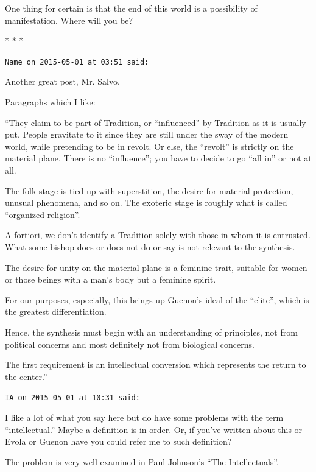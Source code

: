 One thing for certain is that the end of this world is a possibility of manifestation. Where will you be?



\begin{center}* * *\end{center}

\begin{footnotesize}
\begin{sffamily}
\texttt{Name on 2015-05-01 at 03:51 said:}

Another great post, Mr. Salvo.

Paragraphs which I like:

``They claim to be part of Tradition, or ``influenced'' by Tradition as it is usually put. People gravitate to it since they are still under the sway of the modern world, while pretending to be in revolt. Or else, the ``revolt'' is strictly on the material plane. There is no ``influence''; you have to decide to go ``all in'' or not at all.

The folk stage is tied up with superstition, the desire for material protection, unusual phenomena, and so on. The exoteric stage is roughly what is called ``organized religion''.

A fortiori, we don't identify a Tradition solely with those in whom it is entrusted. What some bishop does or does not do or say is not relevant to the synthesis.

The desire for unity on the material plane is a feminine trait, suitable for women or those beings with a man's body but a feminine spirit.

For our purposes, especially, this brings up Guenon's ideal of the ``elite'', which is the greatest differentiation.

Hence, the synthesis must begin with an understanding of principles, not from political concerns and most definitely not from biological concerns.

The first requirement is an intellectual conversion which represents the return to the center.''

\hfill

\texttt{IA on 2015-05-01 at 10:31 said:}

I like a lot of what you say here but do have some problems with the term ``intellectual.'' Maybe a definition is in order. Or, if you've written about this or Evola or Guenon have you could refer me to such definition?

The problem is very well examined in Paul Johnson's ``The Intellectuals''.


\end{sffamily}
\end{footnotesize}
